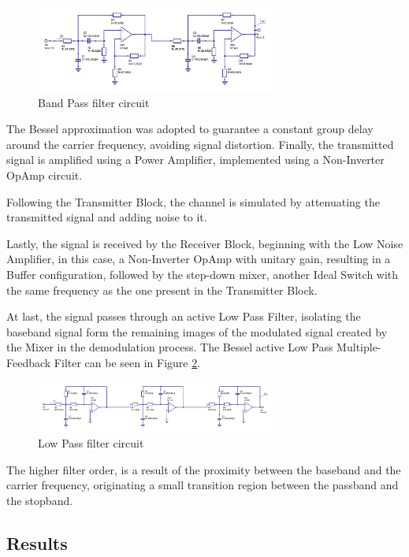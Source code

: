 \begin{figure}[H]
    \centering
    \includegraphics*[width=0.7\textwidth]{Images/Qucs_BPcircuit.png}
    \caption{Band Pass filter circuit}
    \label{fig:Qucs_BPcircuit}
\end{figure}

The Bessel approximation was adopted to guarantee a constant group delay around the carrier frequency, avoiding signal distortion. Finally, the transmitted signal is amplified using a Power Amplifier, implemented using a Non-Inverter OpAmp circuit.

Following the Transmitter Block, the channel is simulated by attenuating the transmitted signal and adding noise to it. 

Lastly, the signal is received by the Receiver Block, beginning with the Low Noise Amplifier, in this case, a Non-Inverter OpAmp with unitary gain, resulting in a Buffer configuration, followed by the step-down mixer, another Ideal Switch with the same frequency as the one present in the Transmitter Block. 

At last, the signal passes through an active Low Pass Filter, isolating the baseband signal form the remaining images of the modulated signal created by the Mixer in the demodulation process. The Bessel active Low Pass Multiple-Feedback Filter can be seen in Figure \ref{fig:Qucs_LPcircuit}.

\begin{figure}[H]
    \centering
    \includegraphics*[width=0.7\textwidth]{Images/Qucs_LPcircuit.png}
    \caption{Low Pass filter circuit}
    \label{fig:Qucs_LPcircuit}
\end{figure}

The higher filter order, is a result of the proximity between the baseband and the carrier frequency, originating a small transition region between the passband and the stopband. 

\subsection{Results}

